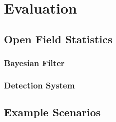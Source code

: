 \chapter{Evaluation}
\section{Open Field Statistics}
\subsection{Bayesian Filter}
\subsection{Detection System}

\section{Example Scenarios}